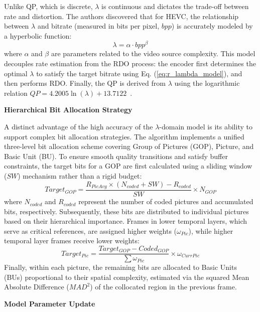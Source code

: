 Unlike QP, which is discrete, $\lambda$ is continuous and dictates the trade-off between rate and distortion. The authors discovered that for HEVC, the relationship between $\lambda$ and bitrate (measured in bits per pixel, $bpp$) is accurately modeled by a hyperbolic function:
\begin{equation} \label{eq:r_lambda_model}
    \lambda = \alpha \cdot bpp^{\beta}
\end{equation}
where $\alpha$ and $\beta$ are parameters related to the video source complexity. This model decouples rate estimation from the RDO process: the encoder first determines the optimal $\lambda$ to satisfy the target bitrate using Eq. (\ref{eq:r_lambda_model}), and then performs RDO. Finally, the QP is derived from $\lambda$ using the logarithmic relation $QP = 4.2005 \ln(\lambda) + 13.7122$~\cite{math_35}.

\noindent \textbf{Hierarchical Bit Allocation Strategy}

A distinct advantage of the high accuracy of the $\lambda$-domain model is its ability to support complex bit allocation strategies. The algorithm implements a unified three-level bit allocation scheme covering Group of Pictures (GOP), Picture, and Basic Unit (BU).
To ensure smooth quality transitions and satisfy buffer constraints, the target bits for a GOP are first calculated using a sliding window ($SW$) mechanism rather than a rigid budget:
\begin{equation}
    Target_{GOP} = \frac{R_{PicAvg} \times (N_{coded} + SW) - R_{coded}}{SW} \times N_{GOP}
\end{equation}
where $N_{coded}$ and $R_{coded}$ represent the number of coded pictures and accumulated bits, respectively. Subsequently, these bits are distributed to individual pictures based on their hierarchical importance. Frames in lower temporal layers, which serve as critical references, are assigned higher weights ($\omega_{Pic}$), while higher temporal layer frames receive lower weights:
\begin{equation}
    Target_{Pic} = \frac{Target_{GOP} - Coded_{GOP}}{\sum \omega_{Pic}} \times \omega_{CurrPic}
\end{equation}
Finally, within each picture, the remaining bits are allocated to Basic Units (BUs) proportional to their spatial complexity, estimated via the squared Mean Absolute Difference ($MAD^2$) of the collocated region in the previous frame.

\noindent \textbf{Model Parameter Update}

